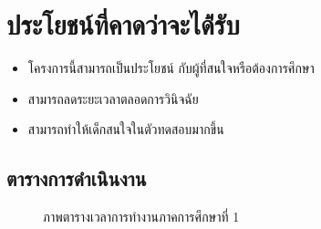 \documentclass[12pt,oneside,openright,a4paper]{cpe-thai-project}
\begin{document}
\section{ประโยชน์ที่คาดว่าจะได้่รับ}
\begin{itemize}
  \item โครงการนี้สามารถเป็นประโยชน์ กับผู้ที่สนใจหรือต้องการศึกษา
  \item สามารถลดระยะเวลาตลอดการวินิจฉัย
  \item สามารถทำให้เด็กสนใจในตัวทดสอบมากขึ้น
\end{itemize}
\begin{landscape}
\section{ตารางการดำเนินงาน}
\begin{figure}[ht]\centering
  \setlength{\fboxrule}{0.2mm} %
  \setlength{\fboxsep}{1cm}
  \caption{ภาพตารางเวลาการทำงานภาคการศึกษาที่ 1}\label{fig:system}
 \end{figure}
 \begin{figure}[ht]\centering
  \setlength{\fboxrule}{0.2mm} %
  \setlength{\fboxsep}{1cm}

\end{figure}
\end{landscape}
\end{document}
